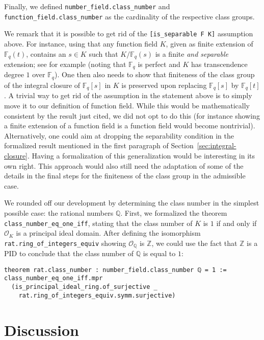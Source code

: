 \documentclass[sn-mathphys]{sn-jnl}%
\newcommand{\lean}[1]{\texttt{#1}\xspace}
\newcommand*{\OK}[1][K]{\mathcal{O}_{#1}}
\newcommand*{\Fq}[1][q]{\mathbb{F}_{#1}}
\newcommand{\QQ}{\mathbb{Q}}
\renewcommand{\Z}{\mathbb{Z}}
\begin{document}
Finally, we defined \lean{number\_field.class\_number} and \lean{function\_\-field.\linebreak[0]class\_\-number} as the cardinality of the respective class groups.

We remark that it is possible to get rid of the \lean{[is\_separable F K]} assumption above. 
For instance, using that any function field $K$, given as finite extension of $\Fq[q](t)$, contains an $s \in K$ such that $K/\Fq[q](s)$ is a finite \emph{and separable} extension; see for example \cite[Corollary 4.4 in Chapter VIII]{Lang} (noting that $\Fq$ is perfect and $K$ has transcendence degree $1$ over $\Fq$).
One then also needs to show that finiteness of the class group of the integral closure of $\Fq[q][s]$ in $K$ is preserved upon replacing $\Fq[q][s]$ by $\Fq[q][t]$.
A trivial way to get rid of the assumption in the statement above is to simply move it to our definition of function field.
While this would be mathematically consistent by the result just cited, we did not opt to do this (for instance showing a finite extension of a function field is a function field
would become nontrivial).
Alternatively, one could aim at dropping the separability condition in the formalized result mentioned in the first paragraph of Section~\ref{sec:integral-closure}.
Having a formalization of this generalization would be interesting in its own right.
This approach would also still need the adaptation of some of the details in the final steps for the finiteness of the class group in the admissible case.

We rounded off our development by determining the class number in the simplest possible case: the rational numbers $\QQ$.
First, we formalized the theorem \lean{class\_number\_eq\_one\_iff}, stating that the class number of $K$ is $1$ if and only if $\OK$ is a principal ideal domain.
After defining the isomorphism \lean{rat.ring\_of\_integers\_equiv} showing $\OK[\QQ]$ is $\Z$,
we could use the fact that $\Z$ is a PID to conclude that the class number of $\QQ$ is equal to $1$:
\begin{lstlisting}
theorem rat.class_number : number_field.class_number ℚ = 1 :=
class_number_eq_one_iff.mpr
  (is_principal_ideal_ring.of_surjective _
    rat.ring_of_integers_equiv.symm.surjective)
\end{lstlisting}

\section{Discussion}
\end{document}
